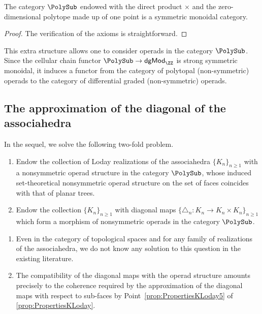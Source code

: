 \begin{lemma}
The category $\PolySub$ endowed with the direct product $\times$ and the zero-dimensional polytope made up of one point is a symmetric monoidal category.
\end{lemma}

\begin{proof}
The verification of the axioms is straightforward.
\end{proof}

This extra structure allows one to consider operads in the category $\PolySub$.
Since the cellular chain functor $\PolySub \to \textsf{dgMod}_{\ZZ}$ is
strong symmetric monoidal, it induces a functor from the category of polytopal (non-symmetric) operads to the category of differential graded (non-symmetric) operads.\enlargethispage{\baselineskip}%

\subsection{The approximation of the diagonal of the associahedra}
In the sequel, we solve the following two-fold problem.

\skpt
\begin{problem}\label{Prob:cellulardiagonal}
\begin{enumerate}
\item Endow the collection of Loday realizations of the associahedra $\{K_n\}_{n\geqslant 1}$ with a nonsymmetric operad structure in the category $\PolySub$, whose induced set-theoretical nonsymmetric operad structure on the set of faces coincides with that of planar trees.

\item Endow the collection $\{K_n\}_{n\geqslant 1}$ with diagonal maps $\{\triangle_n: K_n\to K_n\times K_n\}_{n\geq 1}$ which form a morphism of nonsymmetric operads in the category $\PolySub$.
\end{enumerate}
\end{problem}

\skpt
\begin{remark}
\begin{enumerate}
\item Even in the category of topological spaces and for any family of realizations of the associahedra, we do not know any solution to this question in the existing literature.

\item The compatibility of the diagonal maps with the operad structure amounts precisely to the coherence required by the approximation of the diagonal maps with respect to sub-faces by Point~\eqref{prop:PropertiesKLoday5} of \cref{prop:PropertiesKLoday}.
\end{enumerate}
\end{remark}

